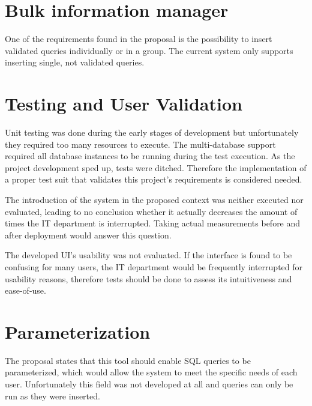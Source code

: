 \section{Bulk information manager}
One of the requirements found in the proposal is the possibility to insert validated queries individually or in a group. The current system only supports inserting single, not validated  queries.

\section{Testing and User Validation}
Unit testing was done during the early stages of development but unfortunately they required too many resources to execute. The multi-database support required all database instances to be running during the test execution. As the project development sped up, tests were ditched. Therefore the implementation of a proper test suit that validates this project's requirements is considered needed.

The introduction of the system in the proposed context was neither executed nor evaluated, leading to no conclusion whether it actually decreases the amount of times the \gls{IT} department is interrupted. Taking actual measurements before and after deployment would answer this question.

The developed \gls{UI}'s usability was not evaluated. If the interface is found to be confusing for many users, the \gls{IT} department would be frequently interrupted for usability reasons, therefore tests should be done to assess its intuitiveness and ease-of-use.

\section{Parameterization}
The proposal states that this tool should enable \gls{SQL} queries to be parameterized, which would allow the system to meet the specific needs of each user. Unfortunately this field was not developed at all and queries can only be run as they were inserted.

